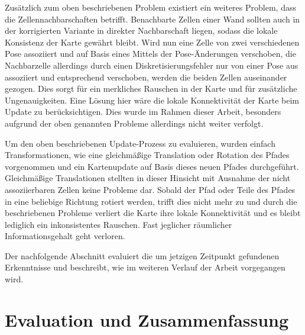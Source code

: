 Zusätzlich zum oben beschriebenen Problem existiert ein weiteres Problem, dass die Zellennachbarschaften betrifft. Benachbarte Zellen einer Wand sollten auch in der korrigierten Variante in direkter Nachbarschaft liegen, sodass die lokale Konsistenz der Karte gewährt bleibt. Wird nun eine Zelle von zwei verschiedenen Pose assoziiert und auf Basis eines Mittels der Pose-Änderungen verschoben, die Nachbarzelle allerdings durch einen Diskretisierungsfehler nur von einer Pose aus assoziiert und entsprechend verschoben, werden die beiden Zellen auseinander gezogen. Dies sorgt für ein merkliches Rauschen in der Karte und für zusätzliche Ungenauigkeiten. Eine Lösung hier wäre die lokale Konnektivität der Karte beim Update zu berücksichtigen. Dies wurde im Rahmen dieser Arbeit, besonders aufgrund der oben genannten Probleme allerdings nicht weiter verfolgt.

Um den oben beschriebenen Update-Prozess zu evaluieren, wurden einfach Transformationen, wie eine gleichmäßige Translation oder Rotation des Pfades vorgenommen und ein Kartenupdate auf Basis dieses neuen Pfades durchgeführt. Gleichmäßige Translationen stellten in dieser Hinsicht mit Ausnahme der nicht assoziierbaren Zellen keine Probleme dar. Sobald der Pfad oder Teile des Pfades in eine beliebige Richtung rotiert werden, trifft dies nicht mehr zu und durch die beschriebenen Probleme verliert die Karte ihre lokale Konnektivität und es bleibt lediglich ein inkonsistentes Rauschen. Fast jeglicher räumlicher Informationsgehalt geht verloren.

Der nachfolgende Abschnitt evaluiert die um jetzigen Zeitpunkt gefundenen Erkenntnisse und beschreibt, wie im weiteren Verlauf der Arbeit vorgegangen wird.


\section{Evaluation und Zusammenfassung}


